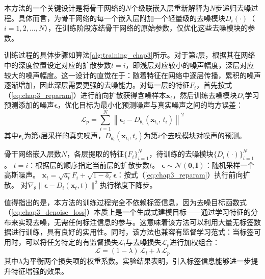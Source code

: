 本方法的一个关键设计是将骨干网络的$N$个级联嵌入层重新解释为$N$步递归去噪过程。具体而言，为骨干网络的每一个嵌入层附加一个轻量级的去噪模块$D_i(\cdot)$（$i = 1, 2, \ldots, N$），在训练阶段冻结骨干网络的原始参数，仅优化这些去噪模块的参数。

训练过程的具体步骤如算法\ref{alg:training_chap3}所示。对于第$i$层，根据其在网络中的深度位置设定对应的扩散步数$t = i$，即浅层对应较小的噪声幅度，深层对应较大的噪声幅度。这一设计的直觉在于：随着特征在网络中逐层传播，累积的噪声逐渐增加，因此深层需要更强的去噪能力。对每一层的特征$F_i$，首先按式（\ref{eq:chap3_reparam}）进行前向扩散获得含噪样本$\mathbf{x}_t$，然后训练去噪模块$D_i$学习预测添加的噪声$\boldsymbol{\epsilon}$，优化目标为最小化预测噪声与真实噪声之间的均方误差：
\begin{equation}
\mathcal{L}_p = \sum_{i=1}^{N}\left\|\boldsymbol{\epsilon}_i - D_{\theta_i}(\mathbf{x}_{t_i},\, t_i)\right\|^2
\label{eq:chap3_denoise_loss}
\end{equation}
其中$\boldsymbol{\epsilon}_i$为第$i$层采样的真实噪声，$D_{\theta_i}(\mathbf{x}_{t_i}, t_i)$为第$i$个去噪模块对噪声的预测。

\begin{algorithm}[htbp]
\caption{特征去噪模块训练算法}
\label{alg:training_chap3}
\begin{algorithmic}[1]
\REQUIRE 骨干网络嵌入层数$N$，各层提取的特征$\{F_i\}_{i=1}^{N}$，待训练的去噪模块$\{D_i(\cdot)\}_{i=1}^{N}$。
\REPEAT
{}
\STATE $t = i$：根据层的顺序指定当前层的扩散步数$t$。
\STATE $\boldsymbol{\epsilon} \sim \mathcal{N}(\mathbf{0}, \mathbf{I})$：随机采样一个高斯噪声。
\STATE $\mathbf{x}_t = \sqrt{\bar{a}_t}F_i + \sqrt{1-\bar{a}_t}\boldsymbol{\epsilon}$：按式（\ref{eq:chap3_reparam}）执行前向扩散。
\STATE 对$\nabla_\theta\|\boldsymbol{\epsilon} - D_i(\mathbf{x}_t, t)\|^2$执行梯度下降步。
\ENDFOR
{}
\end{algorithmic}
\end{algorithm}

值得指出的是，本方法的训练过程完全不依赖标签信息，因为去噪目标函数式（\ref{eq:chap3_denoise_loss}）本质上是一个生成式建模目标——通过学习特征的分布来实现去噪，无需任何标注信息的参与。这意味着该方法可以利用大量无标签数据进行训练，具有良好的实用性。同时，该方法也兼容有监督学习范式：当标签可用时，可以将任务特定的有监督损失$\mathcal{L}_l$与去噪损失$\mathcal{L}_p$进行加权组合：
\begin{equation}
\mathcal{L} = (1-\lambda)\,\mathcal{L}_l + \lambda\,\mathcal{L}_p
\label{eq:chap3_total_loss}
\end{equation}
其中$\lambda$为平衡两个损失项的权重系数。实验结果表明，引入标签信息能够进一步提升特征增强的效果。

